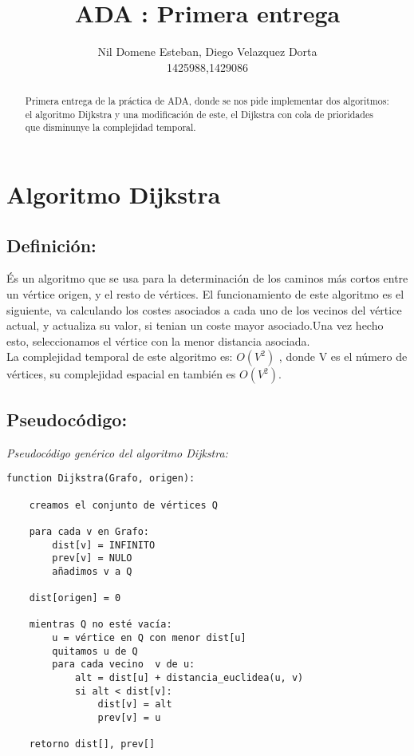 \documentclass[a4paper]{llncs}
\begin{document}
\mainmatter 

\title{ADA : Primera entrega}


\author{Nil Domene Esteban, Diego Velazquez Dorta \\
1425988,1429086}

\tocauthor{{}}

\maketitle

\begin{abstract}
Primera entrega de la práctica de ADA, donde se nos pide implementar dos algoritmos: el algoritmo Dijkstra y una modificación de este, el Dijkstra con cola de prioridades que disminunye la complejidad temporal.
\end{abstract}

\medskip

\begingroup
\let\clearpage\relax
\tableofcontents
\endgroup

\medskip

\section{Algoritmo Dijkstra}
\subsection{Definición:}

És un algoritmo que se usa para la determinación de los caminos más cortos entre un vértice origen, y el resto de vértices. El funcionamiento de este algoritmo es el siguiente, va  calculando los costes asociados a cada uno de los vecinos del vértice actual, y actualiza su valor, si tenian un coste mayor asociado.Una vez hecho esto, seleccionamos el vértice con la menor distancia asociada.\\
La complejidad temporal de este algoritmo es: $O(V^2)$ , donde V es el número de vértices, su complejidad espacial en también es $O(V^2)$.
\subsection{Pseudocódigo: }

{\it Pseudocódigo genérico del algoritmo Dijkstra: }
\begin{verbatim}
function Dijkstra(Grafo, origen):

    creamos el conjunto de vértices Q
    
    para cada v en Grafo:          
        dist[v] = INFINITO                
        prev[v] = NULO                 
        añadimos v a Q   
        
    dist[origen] = 0  
    
    mientras Q no esté vacía:
        u = vértice en Q con menor dist[u]
        quitamos u de Q 
        para cada vecino  v de u:           
            alt = dist[u] + distancia_euclidea(u, v)
            si alt < dist[v]:               
                dist[v] = alt 
                prev[v] = u 
                
    retorno dist[], prev[]
\end{verbatim}
\end{document}

